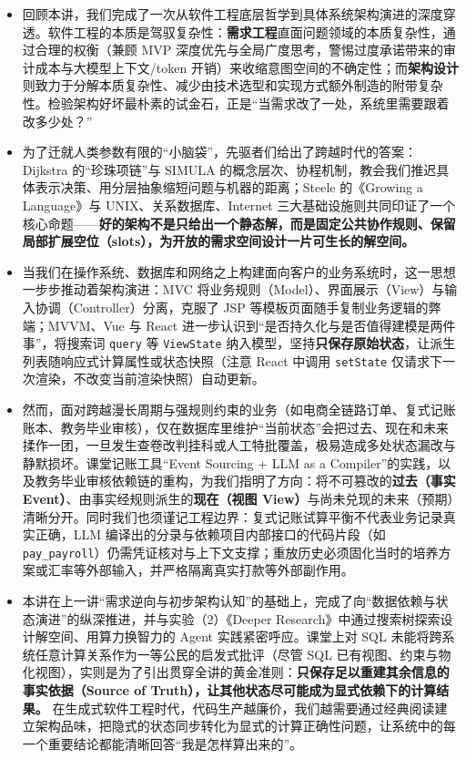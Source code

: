 \documentclass[UTF8,a4paper,11pt,fontset=fandol]{ctexart}
\begin{document}
\begin{itemize}
\item 回顾本讲，我们完成了一次从软件工程底层哲学到具体系统架构演进的深度穿透。软件工程的本质是驾驭复杂性：\textbf{需求工程}直面问题领域的本质复杂性，通过合理的权衡（兼顾 MVP 深度优先与全局广度思考，警惕过度承诺带来的审计成本与大模型上下文/token 开销）来收缩意图空间的不确定性；而\textbf{架构设计}则致力于分解本质复杂性、减少由技术选型和实现方式额外制造的附带复杂性。检验架构好坏最朴素的试金石，正是“当需求改了一处，系统里需要跟着改多少处？”



\item 为了迁就人类参数有限的“小脑袋”，先驱者们给出了跨越时代的答案：Dijkstra 的“珍珠项链”与 SIMULA 的概念层次、协程机制，教会我们推迟具体表示决策、用分层抽象缩短问题与机器的距离；Steele 的《Growing a Language》与 UNIX、关系数据库、Internet 三大基础设施则共同印证了一个核心命题——\textbf{好的架构不是只给出一个静态解，而是固定公共协作规则、保留局部扩展空位（slots），为开放的需求空间设计一片可生长的解空间。}



\item 当我们在操作系统、数据库和网络之上构建面向客户的业务系统时，这一思想一步步推动着架构演进：MVC 将业务规则（Model）、界面展示（View）与输入协调（Controller）分离，克服了 JSP 等模板页面随手复制业务逻辑的弊端；MVVM、Vue 与 React 进一步认识到“是否持久化与是否值得建模是两件事”，将搜索词 \texttt{query} 等 \texttt{ViewState} 纳入模型，坚持\textbf{只保存原始状态}，让派生列表随响应式计算属性或状态快照（注意 React 中调用 \texttt{setState} 仅请求下一次渲染，不改变当前渲染快照）自动更新。



\item 然而，面对跨越漫长周期与强规则约束的业务（如电商全链路订单、复式记账账本、教务毕业审核），仅在数据库里维护“当前状态”会把过去、现在和未来揉作一团，一旦发生查卷改判挂科或人工特批覆盖，极易造成多处状态漏改与静默损坏。课堂记账工具“Event Sourcing + LLM as a Compiler”的实践，以及教务毕业审核依赖链的重构，为我们指明了方向：将不可篡改的\textbf{过去（事实 Event）}、由事实经规则派生的\textbf{现在（视图 View）}与尚未兑现的未来（预期）清晰分开。同时我们也须谨记工程边界：复式记账试算平衡不代表业务记录真实正确，LLM 编译出的分录与依赖项目内部接口的代码片段（如 \texttt{pay\_payroll}）仍需凭证核对与上下文支撑；重放历史必须固化当时的培养方案或汇率等外部输入，并严格隔离真实打款等外部副作用。



\item 本讲在上一讲“需求逆向与初步架构认知”的基础上，完成了向“数据依赖与状态演进”的纵深推进，并与实验（2）《Deeper Research》中通过搜索树探索设计解空间、用算力换智力的 Agent 实践紧密呼应。课堂上对 SQL 未能将跨系统任意计算关系作为一等公民的启发式批评（尽管 SQL 已有视图、约束与物化视图），实则是为了引出贯穿全讲的黄金准则：\textbf{只保存足以重建其余信息的事实依据（Source of Truth），让其他状态尽可能成为显式依赖下的计算结果。} 在生成式软件工程时代，代码生产越廉价，我们越需要通过经典阅读建立架构品味，把隐式的状态同步转化为显式的计算正确性问题，让系统中的每一个重要结论都能清晰回答“我是怎样算出来的”。
\end{itemize}
\end{document}
